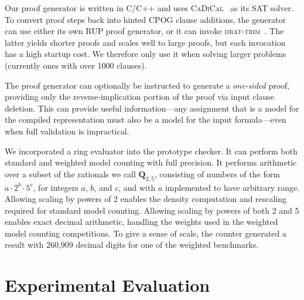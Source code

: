 \documentclass[twoside,11pt]{article}
\newcommand{\drational}{\textbf{Q}_{2,5}}
\newcommand{\progname}[1]{\textsc{#1}}
\newcommand{\cadical}{\progname{CaDiCal}}
\newcommand{\dtrim}{\progname{drat-trim}}
\begin{document}
Our proof generator is written in C/C++ and uses
\cadical{}~\cite{biere-cadical-2019} as its SAT solver.  To convert
proof steps back into hinted CPOG clause additions, the generator can
use either its own RUP proof generator, or it can invoke
\dtrim{}~\cite{heule:cade:2013}.  The latter yields shorter proofs and scales well
to large proofs, but each invocation has a high startup cost.  We
therefore only use it when solving larger problems (currently ones
with over 1000 clauses).

The proof generator can optionally be instructed to generate a {\em
one-sided} proof, providing only the reverse-implication portion of the proof via
input clause deletion.  This can provide useful information---any
assignment that is a model for the compiled representation
must also be a model for the input formula---even when
full validation is impractical.

We incorporated a ring evaluator into the prototype checker.  It
can perform both standard and weighted
model counting with full precision.  It performs arithmetic over a subset of the rationals
we call $\drational$, consisting of numbers of the form $a \cdot 2^{b}
\cdot 5^{c}$, for integers $a$, $b$, and $c$, and with $a$ implemented
to have arbitrary range.  Allowing scaling by powers of 2 enables the
density computation and rescaling required for standard model
counting.  Allowing scaling by powers of both 2 and 5 enables exact
decimal arithmetic, handling the weights used in the weighted model
counting competitions.  To give a sense of scale, the counter
generated a result with 260,909 decimal digits
for one of the weighted benchmarks.


\section{Experimental Evaluation}
\label{sect:experimental}

\end{document}
